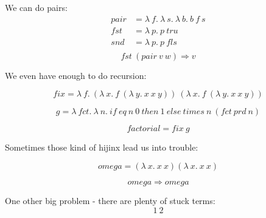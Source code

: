\begin{frame}
  We can do pairs:
  \begin{align*}
    pair &= \lambda~f.~\lambda~s.~\lambda~b.~b~f~s \\
    fst &= \lambda~p.~p~tru \\
    snd &= \lambda~p.~p~fls \\
  \end{align*}
  \[fst~\left(pair~v~w\right) \Rightarrow v\]
\end{frame}

\begin{frame}
  We even have enough to do recursion:
  
  \[fix = \lambda~f.~\left(\lambda~x.~f~\left(\lambda~y.~x~x~y\right)\right)~\left(\lambda~x.~f~\left(\lambda~y.~x~x~y\right)\right)\]

  \[g = \lambda~fct.~\lambda~n.~if~eq~n~0~then~1~else~times~n~\left(fct~prd~n\right)\]

  \[factorial = fix~g\]
\end{frame}

\begin{frame}
  Sometimes those kind of hijinx lead us into trouble:
  
  \[omega = \left(\lambda~x.~x~x\right) \left(\lambda~x.~x~x\right)\]

  \[omega \Rightarrow omega\]
\end{frame}

\begin{frame}
  One other big problem - there are plenty of stuck terms:
  \[1~2\]
\end{frame}

